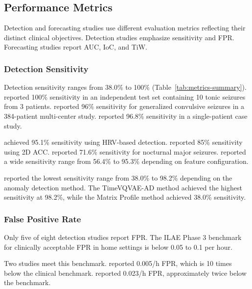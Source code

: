 \subsection{Performance Metrics}

Detection and forecasting studies use different evaluation metrics reflecting their distinct clinical objectives. Detection studies emphasize sensitivity and FPR. Forecasting studies report AUC, IoC, and TiW.

\subsubsection{Detection Sensitivity}

Detection sensitivity ranges from 38.0\% to 100\% (Table~\ref{tab:metrics-summary}). \textcite{fineDetectionKeyAutomated2025} reported 100\% sensitivity in an independent test set containing 10 tonic seizures from 3 patients. \textcite{spahrDeepLearningbasedDetection2025} reported 96\% sensitivity for generalized convulsive seizures in a 384-patient multi-center study. \textcite{singhrathoreDevelopmentMultimodalMachine2024} reported 96.8\% sensitivity in a single-patient case study.

\textcite{elemamAutomatedValidatedTool2025} achieved 95.1\% sensitivity using HRV-based detection. \textcite{borujenyDetectionEpilepticSeizure2013} reported 85\% sensitivity using 2D ACC. \textcite{dongTwoLayerEnsembleMethod2022} reported 71.6\% sensitivity for nocturnal major seizures. \textcite{wangEpilepticSeizureDetection2025} reported a wide sensitivity range from 56.4\% to 95.3\% depending on feature configuration.

\textcite{reintjesECGBasedDetectionEpileptic2025} reported the lowest sensitivity range from 38.0\% to 98.2\% depending on the anomaly detection method. The TimeVQVAE-AD method achieved the highest sensitivity at 98.2\%, while the Matrix Profile method achieved 38.0\% sensitivity.

\subsubsection{False Positive Rate}

Only five of eight detection studies report FPR. The ILAE Phase 3 benchmark for clinically acceptable FPR in home settings is below 0.05 to 0.1 per hour.

Two studies meet this benchmark. \textcite{spahrDeepLearningbasedDetection2025} reported 0.005/h FPR, which is 10 times below the clinical benchmark. \textcite{fineDetectionKeyAutomated2025} reported 0.023/h FPR, approximately twice below the benchmark.

